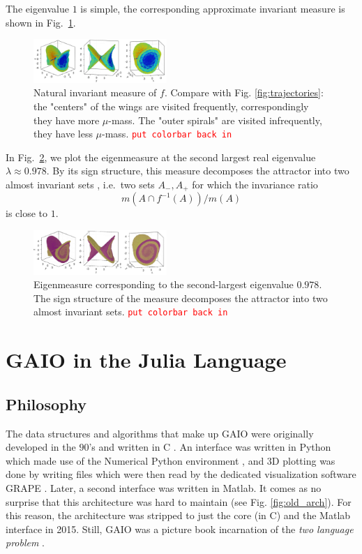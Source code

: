 \documentclass{juliacon}
\newcommand{\todo}[1]{\textcolor{red}{\texttt{#1}}}
\begin{document}
The eigenvalue $1$ is simple, the corresponding approximate invariant measure is shown in Fig.~\ref{fig:invariantmeasure}.  
\begin{figure}[h]
    \centering
    \includegraphics[width=0.45\textwidth]{inv_measure.jpg}
    \caption{Natural invariant measure of $f$. Compare with Fig. \ref{fig:trajectories}: the "centers" of the wings are visited frequently, correspondingly they have more $\mu$-mass. The "outer spirals" are visited infrequently, they have less $\mu$-mass. \todo{put colorbar back in}}
    \label{fig:invariantmeasure}
\end{figure}

In Fig.~\ref{fig:almostinvariant}, we plot the eigenmeasure at the second largest real eigenvalue $\lambda\approx 0.978$. By its sign structure, this measure decomposes the attractor into two almost invariant sets \cite{DeJu:99}, i.e.\ two sets $A_-,A_+$ for which the invariance ratio $$m(A\cap f^{-1} (A))/m(A)$$ is close to $1$.
\begin{figure}[h]
    \centering
    \includegraphics[width=0.45\textwidth]{almost_inv.jpg}
    \caption{Eigenmeasure corresponding to the second-largest eigenvalue $0.978$. The sign structure of the measure decomposes the attractor into two almost invariant sets. \todo{put colorbar back in}}
    \label{fig:almostinvariant}
\end{figure}

\section{GAIO in the Julia Language}
\label{sec:architecture}

\subsection{Philosophy}

The data structures and algorithms that make up GAIO were originally developed in the $90$'s and written in C \cite{DeFrJu:01}. An interface was written in Python which made use of the Numerical Python environment \cite{harris2020array}, and 3D plotting was done by writing files which were then read by the dedicated visualization software GRAPE \cite{RuWi92a}.  Later, a second interface was written in Matlab.  It comes as no surprise that this architecture was hard to maintain (see Fig. \ref{fig:old_arch}). For this reason, the architecture was stripped to just the core (in C) and the Matlab interface in 2015. Still, GAIO was a picture book incarnation of the \emph{two language problem} \cite{BeEdKaSh:17}. 
\end{document}
